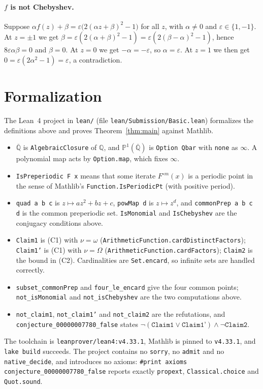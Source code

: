 \documentclass[11pt]{article}
\theoremstyle{plain}
\theoremstyle{definition}
\theoremstyle{remark}
\newcommand{\Qb}{\overline{\mathbb Q}}
\newcommand{\PP}{\mathbb P^1(\Qb)}
\begin{document}
\paragraph{$f$ is not Chebyshev.} Suppose $\alpha f(z)+\beta=\varepsilon\bigl(2(\alpha
z+\beta)^2-1\bigr)$ for all $z$, with $\alpha\ne0$ and $\varepsilon\in\{1,-1\}$.
At $z=\pm1$ we get $\beta=\varepsilon(2(\alpha+\beta)^2-1)=\varepsilon(2(\beta-
\alpha)^2-1)$, hence $8\varepsilon\alpha\beta=0$ and $\beta=0$. At $z=0$ we get
$-\alpha=-\varepsilon$, so $\alpha=\varepsilon$. At $z=1$ we then get
$0=\varepsilon(2\alpha^2-1)=\varepsilon$, a contradiction.

\section{Formalization}

\sloppy
The Lean~4 project in \texttt{lean/} (file \texttt{lean/Submission/Basic.lean})
formalizes the definitions above and proves Theorem~\ref{thm:main} against Mathlib.
\begin{itemize}
  \item $\Qb$ is \texttt{AlgebraicClosure} of $\mathbb Q$, and $\PP$ is \texttt{Option Qbar}
    with \texttt{none} as $\infty$. A polynomial map acts by \texttt{Option.map},
    which fixes $\infty$.
  \item \texttt{IsPreperiodic F x} means that some iterate $F^{\circ m}(x)$ is a
    periodic point in the sense of Mathlib's \texttt{Function.IsPeriodicPt} (with
    positive period).
  \item \texttt{quad a b c} is $z\mapsto az^2+bz+c$, \texttt{powMap d} is $z\mapsto
    z^d$, and \texttt{commonPrep a b c d} is the common preperiodic set.
    \texttt{IsMonomial} and \texttt{IsChebyshev} are the conjugacy conditions above.
  \item \texttt{Claim1} is (C1) with $\nu=\omega$
    (\texttt{ArithmeticFunction.cardDistinctFactors}); \texttt{Claim1'} is (C1) with
    $\nu=\Omega$ (\texttt{ArithmeticFunction.cardFactors}); \texttt{Claim2} is the
    bound in (C2). Cardinalities are \texttt{Set.encard}, so infinite sets are
    handled correctly.
  \item \texttt{subset\_commonPrep} and \texttt{four\_le\_encard} give the four
    common points; \texttt{not\_isMonomial} and \texttt{not\_isChebyshev} are the
    two computations above.
  \item \texttt{not\_claim1}, \texttt{not\_claim1'} and \texttt{not\_claim2} are the
    refutations, and \texttt{conjecture\_00000007780\_false} states
    $\lnot(\texttt{Claim1}\vee\texttt{Claim1'})\wedge\lnot\texttt{Claim2}$.
\end{itemize}
The toolchain is \texttt{leanprover/lean4:v4.33.1}, Mathlib is pinned to
\texttt{v4.33.1}, and \texttt{lake build} succeeds. The project contains no
\texttt{sorry}, no \texttt{admit} and no \texttt{native\_decide}, and introduces no
axioms: \texttt{\#print axioms conjecture\_00000007780\_false} reports exactly
\texttt{propext}, \texttt{Classical.choice} and \texttt{Quot.sound}.
\end{document}
